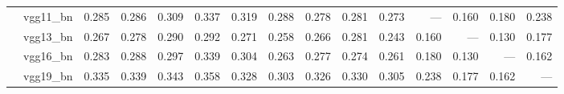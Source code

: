 \begin{table}
\begin{tabular}{llrrrrrrrrrrrrr}
       & vgg11_bn &                 0.285 &                 0.286 &                 0.309 &               0.337 &                   0.319 &                   0.288 &              0.278 &              0.281 &              0.273 &                 --- &               0.160 &               0.180 &               0.238 \\
       & vgg13_bn &                 0.267 &                 0.278 &                 0.290 &               0.292 &                   0.271 &                   0.258 &              0.266 &              0.281 &              0.243 &               0.160 &                 --- &               0.130 &               0.177 \\
       & vgg16_bn &                 0.283 &                 0.288 &                 0.297 &               0.339 &                   0.304 &                   0.263 &              0.277 &              0.274 &              0.261 &               0.180 &               0.130 &                 --- &               0.162 \\
       & vgg19_bn &                 0.335 &                 0.339 &                 0.343 &               0.358 &                   0.328 &                   0.303 &              0.326 &              0.330 &              0.305 &               0.238 &               0.177 &               0.162 &                 --- \\
\bottomrule
\end{tabular}
\end{table}
